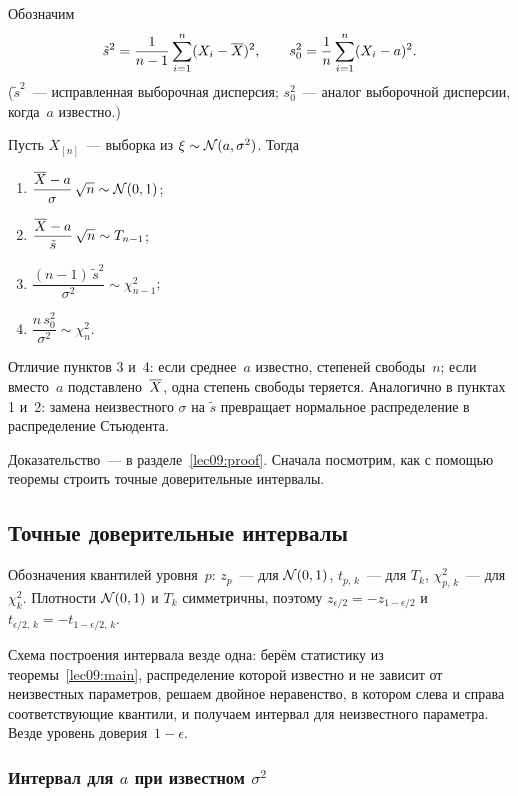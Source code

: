 Обозначим
\[
  \tilde s^2 = \frac{1}{n-1} \sum_{i=1}^n (X_i - \overline{X})^2, \qquad
  s_0^2 = \frac1n \sum_{i=1}^n (X_i - a)^2.
\]
($\tilde s^2$~--- исправленная выборочная дисперсия; $s_0^2$~--- аналог выборочной дисперсии,
когда~$a$ известно.)

\begin{theorem}
  \label{lec09:main}
  Пусть $X_{[n]}$~--- выборка из $\xi \sim \mathcal{N}(a, \sigma^2)$. Тогда
  \begin{enumerate}
    \item $\dfrac{\overline{X} - a}{\sigma}\, \sqrt{n} \sim \mathcal{N}(0, 1)$;
    \item $\dfrac{\overline{X} - a}{\tilde s}\, \sqrt{n} \sim T_{n-1}$;
    \item $\dfrac{(n-1)\, \tilde s^2}{\sigma^2} \sim \chi^2_{n-1}$;
    \item $\dfrac{n\, s_0^2}{\sigma^2} \sim \chi^2_n$.
  \end{enumerate}
\end{theorem}

Отличие пунктов 3 и~4: если среднее~$a$ известно, степеней свободы~$n$; если вместо~$a$
подставлено~$\overline{X}$, одна степень свободы теряется. Аналогично в пунктах 1 и~2: замена
неизвестного $\sigma$ на $\tilde s$ превращает нормальное распределение в распределение
Стьюдента.

Доказательство~--- в разделе~\ref{lec09:proof}. Сначала посмотрим, как с помощью теоремы
строить точные доверительные интервалы.

\subsection{Точные доверительные интервалы}
\label{lec09:intervals}

Обозначения квантилей уровня~$p$: $z_p$~--- для $\mathcal{N}(0, 1)$, $t_{p,\,k}$~--- для $T_k$,
$\chi^2_{p,\,k}$~--- для $\chi^2_k$. Плотности $\mathcal{N}(0, 1)$ и $T_k$ симметричны, поэтому
$z_{\epsilon/2} = -z_{1-\epsilon/2}$ и $t_{\epsilon/2,\,k} = -t_{1-\epsilon/2,\,k}$.

Схема построения интервала везде одна: берём статистику из теоремы~\ref{lec09:main}, распределение которой
известно и не зависит от неизвестных параметров, решаем двойное неравенство, в котором слева и справа
соответствующие квантили, и получаем интервал для неизвестного параметра. Везде уровень доверия~$1 - \epsilon$.

\subsubsection{Интервал для \texorpdfstring{$a$}{a} при известном \texorpdfstring{$\sigma^2$}{σ²}}

